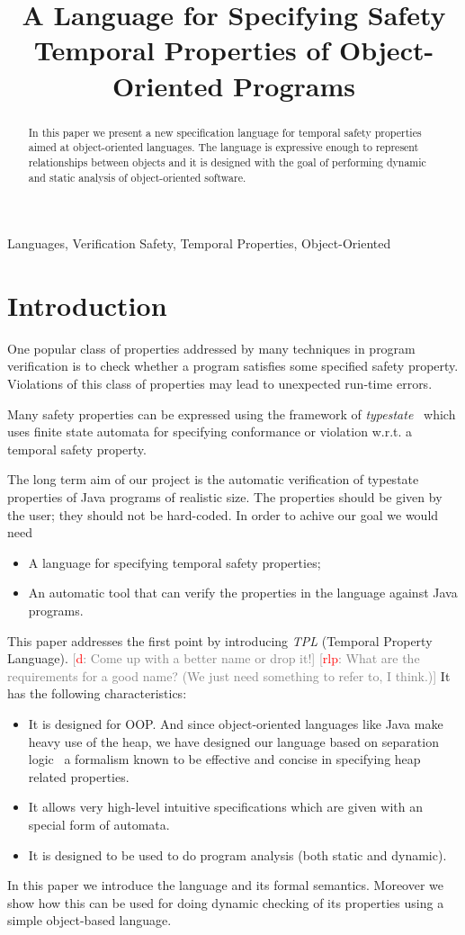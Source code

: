 \documentclass[preprint]{sigplanconf} %
\title{A Language for Specifying Safety Temporal Properties of Object-Oriented Programs}
\newcommand{\note}[2]{\textcolor{gray}{[\textcolor{red}{#1}: #2]}}
\newcommand{\rlp}[1]{\note{rlp}{#1}}
\newcommand{\dd}[1]{\note{d}{#1}}
\newcommand{\dinocomment}[1]{\dd{#1}}
\theoremstyle{definition}
\begin{document}
\maketitle

\begin{abstract} %
In this paper we present a new specification language for temporal safety properties aimed at object-oriented languages.
The language is expressive enough to represent relationships between objects and it is designed with the goal of performing dynamic and static analysis of object-oriented software.
\end{abstract}
\terms Languages, Verification
\keywords Safety, Temporal Properties, Object-Oriented

\section{Introduction} %
One popular class of properties addressed by many techniques in program verification is to check whether a program satisfies some specified safety property.  
Violations of this class of properties may lead to unexpected run-time errors.

Many safety properties can be expressed using the framework of {\em typestate}~\cite{strom1986} which uses finite state automata for specifying conformance or violation w.r.t. a temporal safety property.

The long term aim of our project is the automatic verification of typestate properties of Java programs of realistic size.  
The properties should be given by the user; they should not be hard-coded.
In order to achive our goal we would need
\begin{itemize}
\item A language for specifying temporal safety properties;
\item An automatic tool that can verify the properties in the language
  against Java programs.
\end{itemize}
This paper addresses the first point by introducing {\em TPL} (Temporal Property Language). 
\dinocomment{Come up with a better name or drop it!}
\rlp{What are the requirements for a good name? (We just need
  something to refer to, I think.)}
It has the following characteristics:
\begin{itemize}
\item It is designed for OOP. 
And since object-oriented languages like Java make heavy use of the heap, we have designed our language based on separation logic~\cite{reynolds2002} a formalism known to be effective and concise in specifying heap related properties.
\item It allows very high-level intuitive specifications which are given with an special form of automata.
\item It is designed to be used to do program analysis (both static and dynamic).
\end{itemize}  
In this paper we introduce the language and its formal semantics. 
Moreover we show how this can be used for doing dynamic checking of its properties using a simple object-based language.
\end{document}
